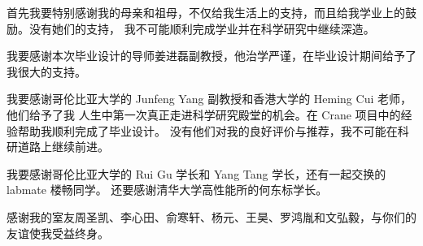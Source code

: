 \begin{acknowledgement}
首先我要特别感谢我的母亲和祖母，不仅给我生活上的支持，而且给我学业上的鼓励。没有她们的支持，
我不可能顺利完成学业并在科学研究中继续深造。

我要感谢本次毕业设计的导师姜进磊副教授，他治学严谨，在毕业设计期间给予了我很大的支持。

我要感谢哥伦比亚大学的 Junfeng Yang 副教授和香港大学的 Heming Cui 老师，他们给予了我
人生中第一次真正走进科学研究殿堂的机会。在 Crane 项目中的经验帮助我顺利完成了毕业设计。
没有他们对我的良好评价与推荐，我不可能在科研道路上继续前进。

我要感谢哥伦比亚大学的 Rui Gu 学长和 Yang Tang 学长，还有一起交换的 labmate 楼畅同学。
还要感谢清华大学高性能所的何东标学长。

感谢我的室友周圣凯、李心田、俞寒轩、杨元、王昊、罗鸿胤和文弘毅，与你们的友谊使我受益终身。
\end{acknowledgement}
